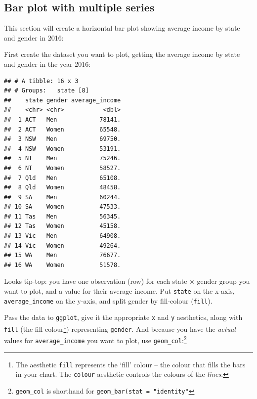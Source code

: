 \documentclass[]{book}
\newenvironment{Shaded}{\begin{snugshade}}{\end{snugshade}}
\newcommand{\DataTypeTok}[1]{\textcolor[rgb]{0.13,0.29,0.53}{#1}}
\newcommand{\DecValTok}[1]{\textcolor[rgb]{0.00,0.00,0.81}{#1}}
\newcommand{\KeywordTok}[1]{\textcolor[rgb]{0.13,0.29,0.53}{\textbf{#1}}}
\newcommand{\NormalTok}[1]{#1}
\newcommand{\OperatorTok}[1]{\textcolor[rgb]{0.81,0.36,0.00}{\textbf{#1}}}
\newcommand{\StringTok}[1]{\textcolor[rgb]{0.31,0.60,0.02}{#1}}
\let\rmarkdownfootnote\footnote%
\def\footnote{\protect\rmarkdownfootnote}
\begin{document}
\hypertarget{bar-multi}{%
\subsection{Bar plot with multiple series}\label{bar-multi}}

This section will create a horizontal bar plot showing average income by state and gender in 2016:

First create the dataset you want to plot, getting the average income by state and gender in the year 2016:

\begin{Shaded}
\end{Shaded}

\begin{verbatim}
## # A tibble: 16 x 3
## # Groups:   state [8]
##    state gender average_income
##    <chr> <chr>           <dbl>
##  1 ACT   Men            78141.
##  2 ACT   Women          65548.
##  3 NSW   Men            69750.
##  4 NSW   Women          53191.
##  5 NT    Men            75246.
##  6 NT    Women          58527.
##  7 Qld   Men            65108.
##  8 Qld   Women          48458.
##  9 SA    Men            60244.
## 10 SA    Women          47533.
## 11 Tas   Men            56345.
## 12 Tas   Women          45158.
## 13 Vic   Men            64908.
## 14 Vic   Women          49264.
## 15 WA    Men            76677.
## 16 WA    Women          51578.
\end{verbatim}

Looks tip-top: you have one observation (row) for each state \(\times\) gender group you want to plot, and a value for their average income. Put \texttt{state} on the x-axis, \texttt{average\_income} on the y-axis, and split gender by fill-colour (\texttt{fill}).

Pass the data to \texttt{ggplot}, give it the appropriate \texttt{x} and \texttt{y} aesthetics, along with \texttt{fill} (the fill colour\footnote{The aesthetic \texttt{fill} represents the `fill' colour -- the colour that fills the bars in your chart. The \texttt{colour} aesthetic controls the colours of the \emph{lines}.}) representing \texttt{gender}. And because you have the \emph{actual} values for \texttt{average\_income} you want to plot, use \texttt{geom\_col}:\footnote{\texttt{geom\_col} is shorthand for \texttt{geom\_bar(stat\ =\ "identity"}}
\end{document}

